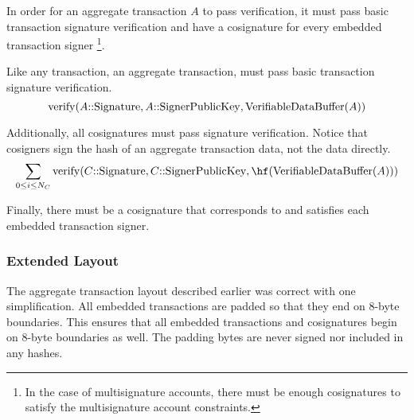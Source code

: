 In order for an aggregate transaction $A$ to pass verification, it must pass basic transaction signature verification and have a cosignature for every embedded transaction signer
\footnote{In the case of multisignature accounts, there must be enough cosignatures to satisfy the multisignature account constraints.}.

Like any transaction, an aggregate transaction, must pass basic transaction signature verification.
$$\mathrm{verify}(A\mathrm{{::}Signature}, A\mathrm{{::}SignerPublicKey}, \mathrm{VerifiableDataBuffer}(A))$$

Additionally, all cosignatures must pass signature verification.
Notice that cosigners sign the hash of an aggregate transaction data, not the data directly.
$$\sum_{0\leq i \leq N_C} \mathfunc{verify}(\structField{C}{Signature}, \structField{C}{SignerPublicKey}, \hf(\mathfunc{VerifiableDataBuffer}(A)))$$

Finally, there must be a cosignature that corresponds to and satisfies each embedded transaction signer.

\subsubsection{Extended Layout}

The aggregate transaction layout described earlier was correct with one simplification.
All embedded transactions are padded so that they end on 8-byte boundaries.
This ensures that all embedded transactions and cosignatures begin on 8-byte boundaries as well.
The padding bytes are never signed nor included in any hashes.

\begin{figure}[H]
\end{figure}

